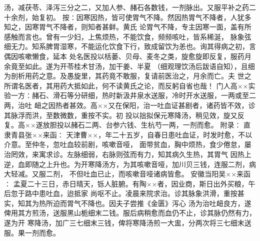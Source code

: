 \documentclass[a4paper,12pt,UTF8,twoside]{ctexbook}
\begin{document}
汤，减茯苓、泽泻三分之二，又加人参、赭石各数钱，一剂脉出。又服平补之药二十余剂，始复初。 
按∶因寒因热，皆可使胃气不降。然因热胃气不降者，人犹多知之，因寒胃气不降者，则知者甚鲜。黄氏 
论胃气不降，专主因寒一面，盖有所感触而言也。曾有一少妇，上焦烦热，不能饮食，频频咳吐，皆系稀涎， 
脉象弦细无力。知系脾胃湿寒，不能运化饮食下行，致成留饮为恙也。询其得病之初，言偶因咳嗽懒食，延本 
处名医投以栝蒌、贝母、麦冬之类，旋愈旋即反复，服药月余竟至如此。遂为开苓桂术甘汤，加干姜、半夏 
（细观理饮汤后跋语自知），且细为剖析用药之意。及愚旋里，其药竟不敢服，复请前医治之，月余而亡。夫 
世之所谓名医者，其用药大抵如此，何不读黄氏之论，而反躬自省也哉！ 
门人高××实验一方∶赭石、滑石等分研细，热时新汲井泉水送服，冷时开水送服，一两或至二两，治吐 
衄之因热者甚效。高××又在保阳，治一吐血证甚剧者，诸药皆不效，诊其脉浮而洪，至数微数，重按不实。初 
投以拙拟保元寒降汤，稍见效，旋又反复。高××遂放胆投以赭石二两、台参六钱、生杭芍一两，一剂而愈。 
附录∶ 
直隶青县张××来函∶ 
天津曹××，年二十五岁，自春日患吐血证，时发时愈，不以介意。至仲冬，忽吐血较前剧，咳嗽音哑， 
面带贫血，胸中烦热，食少倦怠，屡治罔效，来寓求诊。左脉细弱，右脉则弦而有力，知其病久生热，其胃气 
因热上逆，血即随之上升也。为开寒降汤方，为其咳嗽音哑，加川贝三钱，连服二剂，病大轻减。又服二剂， 
不但吐血已止，而咳嗽音哑诸病皆愈。 
安徽当阳吴××来函∶ 
孟夏二十三日，赤日晴天，铄人脏腑。有陶××者，因业商，斯日出外买粮，午后忽于路中患吐血，迨抵家 
尚呕不止。凌晨来院求治。诊其脉象洪滑，重按甚实，知其为热所迫而胃气不降也。因夫子尝推《金匮》泻心 
汤为治吐衄良方，遂俾用其方煎汤，送服黑山栀细末二钱。服后病稍愈而血仍不止，诊其脉仍然有力，遂为开 
寒降汤，加广三七细末三钱，俾将寒降汤煎一大盅，分两次将三七细末送服。果一剂而愈。 
\end{document}
